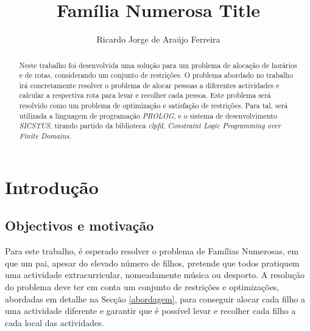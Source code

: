 \documentclass[runningheads]{llncs}
\begin{document}
%
\title{Família Numerosa Title}
%
%
\author{Ricardo Jorge de Araújo Ferreira\\
}
%
%
%
\maketitle              %
%
\begin{abstract}
Neste trabalho foi desenvolvida uma solução para um problema de alocação de horários e de rotas, considerando um conjunto de restrições. O problema abordado no trabalho irá concretamente resolver o problema de alocar pessoas a diferentes actividades e calcular a respectiva rota para levar e recolher cada pessoa. Este problema será resolvido como um problema de optimização e satisfação de restrições. Para tal, será utilizada a linguagem de programação \textit{PROLOG}, e o sistema de desenvolvimento \textit{SICSTUS}, tirando partido da biblioteca \textit{clpfd}, \textit{Constraint Logic Programming over Finite Domains}.

\end{abstract}
%
%
%
\section{Introdução}\label{introducao}

\subsection{Objectivos e motivação}
Para este trabalho, é esperado resolver o problema de Famílias Numerosas, em que um pai, apesar do elevado número de filhos, pretende que todos pratiquem uma actividade extracurricular, nomeadamente música ou desporto. A resolução do problema deve ter em conta um conjunto de restrições e optimizações, abordadas em detalhe na Secção \ref{abordagem}, para conseguir alocar cada filho a uma actividade diferente e garantir que é possível levar e recolher cada filho a cada local das actividades.
\end{document}
